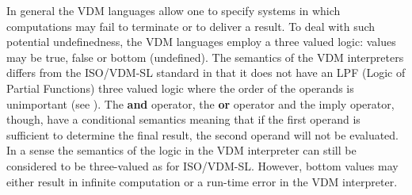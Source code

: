 \documentclass{overturerepchap}
\newcommand{\keyw}[1]{{\bf\ttfamily #1}}
\begin{document}
In general the VDM languages allow one to specify systems in
which computations may fail to terminate or to deliver a result. To
deal with such potential undefinedness,
the VDM languages employ a three valued logic: values may be
true, false or bottom (undefined).
The semantics of the VDM interpreters differs from the ISO/VDM-SL standard
in that it does
not have an LPF (Logic of Partial Functions) three valued logic where
the order of the operands is
unimportant (see \cite{Jones90a}).  The \keyw{and} operator, the
\keyw{or} operator and the imply operator, though, have a conditional
semantics meaning that if the first operand is sufficient to determine
the final result, the second operand will not be evaluated. In a sense
the semantics of the logic in the VDM interpreter can still be considered
to be three-valued as for ISO/VDM-SL. However, bottom values may
either result in infinite computation or a run-time error in the
VDM interpreter.
\end{document}
